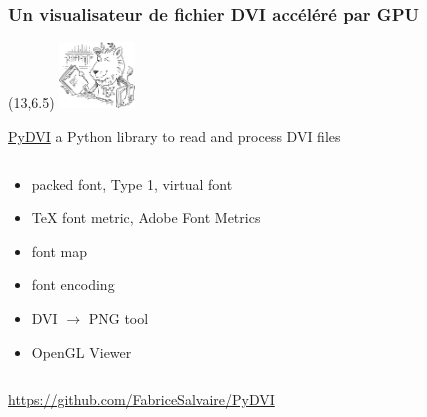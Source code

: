 
\begin{frame}
  \frametitle{Un visualisateur de fichier DVI accéléré par GPU}
  \begin{textblock}{2}(13,6.5)
    \includegraphics[width=2cm]{images/ctan-lion.pdf}
  \end{textblock}
  \begin{center}
    \href{https://github.com/FabriceSalvaire/PyDVI}{PyDVI} a Python library to read and process DVI files
  \end{center}
  \begin{columns}
    \begin{column}{.5\textwidth}
      \begin{itemize}
        \item packed font, Type 1, virtual font
        \item TeX font metric, Adobe Font Metrics
        \item font map
        \item font encoding
      \end{itemize}
      \vspace{1em}
      \begin{itemize}
      \item DVI $\longrightarrow$ PNG tool
      \item OpenGL Viewer
      \end{itemize}
    \end{column}
    \begin{column}{.5\textwidth}
      \begin{center}
      \end{center}
    \end{column}
  \end{columns}
  \vspace{1cm}
  \begin{center}
    \url{https://github.com/FabriceSalvaire/PyDVI}
  \end{center}
\end{frame}

